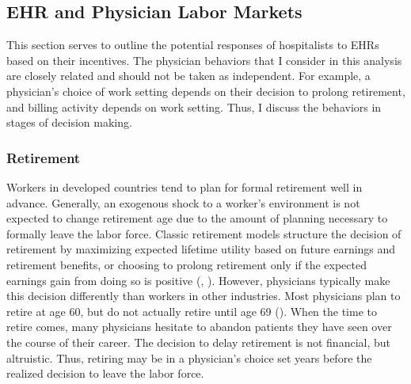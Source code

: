 \documentclass[12pt]{article}
\begin{document}
\subsection{EHR and Physician Labor Markets}

This section serves to outline the potential responses of hospitalists to EHRs based on their incentives. The physician behaviors that I consider in this analysis are closely related and should not be taken as independent. For example, a physician's choice of work setting depends on their decision to prolong retirement, and billing activity depends on work setting. Thus, I discuss the behaviors in stages of decision making. 

\subsubsection{Retirement}

Workers in developed countries tend to plan for formal retirement well in advance. Generally, an exogenous shock to a worker's environment is not expected to change retirement age due to the amount of planning necessary to formally leave the labor force. Classic retirement models structure the decision of retirement by maximizing expected lifetime utility based on future earnings and retirement benefits, or choosing to prolong retirement only if the expected earnings gain from doing so is positive (\cite{gustman1986disaggregated}, \cite{stock1990pension}). However, physicians typically make this decision differently than workers in other industries. Most physicians plan to retire at age 60, but do not actually retire until age 69 (\cite{collier2017challenges}). When the time to retire comes, many physicians hesitate to abandon patients they have seen over the course of their career. The decision to delay retirement is not financial, but altruistic. Thus, retiring may be in a physician's choice set years before the realized decision to leave the labor force. 
\end{document}
